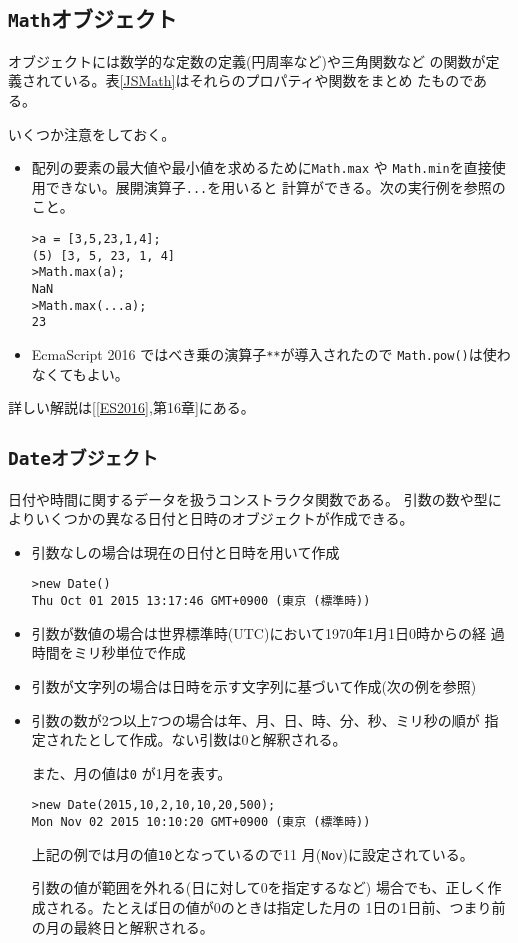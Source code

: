\subsection{\protect\texttt{Math}オブジェクト}
オブジェクトには数学的な定数の定義(円周率など)や三角関数など
の関数が定義されている。表\ref{JSMath}はそれらのプロパティや関数をまとめ
たものである。%

いくつか注意をしておく。
\begin{itemize}
 \item 配列の要素の最大値や最小値を求めるために\Verb+Math.max+ や
       \Verb+Math.min+を直接使用できない。展開演算子\Verb+...+を用いると
       計算ができる。次の実行例を参照のこと。
\begin{Verbatim}
>a = [3,5,23,1,4];
(5) [3, 5, 23, 1, 4]
>Math.max(a);
NaN
>Math.max(...a);
23
\end{Verbatim}
 \item EcmaScript 2016 ではべき乗の演算子\texttt{**}が導入されたので
\texttt{Math.pow()}は使わなくてもよい。
\end{itemize}
詳しい解説は[\ref{ES2016},第16章]にある。
\subsection{\protect\texttt{Dateオブジェクト}}
日付や時間に関するデータを扱うコンストラクタ関数である。
引数の数や型によりいくつかの異なる日付と日時のオブジェクトが作成できる。

\begin{itemize}
 \item 引数なしの場合は現在の日付と日時を用いて作成
\begin{Verbatim}
>new Date()
Thu Oct 01 2015 13:17:46 GMT+0900 (東京 (標準時))
\end{Verbatim}
 \item 引数が数値の場合は世界標準時(UTC)において1970年1月1日0時からの経
       過時間をミリ秒単位で作成
 \item 引数が文字列の場合は日時を示す文字列に基づいて作成(次の例を参照)
 \item 引数の数が2つ以上7つの場合は年、月、日、時、分、秒、ミリ秒の順が
       指定されたとして作成。ない引数は0と解釈される。

       また、月の値は\texttt{0} が1月を表す。
\begin{Verbatim}
>new Date(2015,10,2,10,10,20,500);
Mon Nov 02 2015 10:10:20 GMT+0900 (東京 (標準時))
\end{Verbatim}

上記の例では月の値\texttt{10}となっているので11
月(\Verb+Nov+)に設定されている。

       引数の値が範囲を外れる(日に対して0を指定するなど)
       場合でも、正しく作成される。たとえば日の値が0のときは指定した月の
       1日の1日前、つまり前の月の最終日と解釈される。
\end{itemize}

%
\clearpage
%
\Answertrue
%
\Answerfalse
\begin{Prob}\upshape

\end{Prob}
